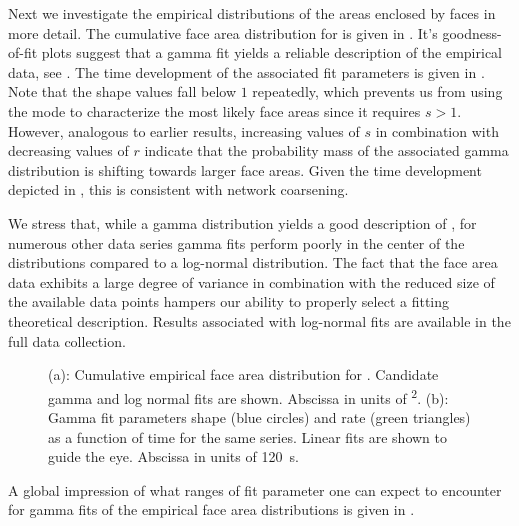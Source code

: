 		Next we investigate the empirical distributions of the areas enclosed by faces in more detail. The cumulative face area distribution for  is given in . It's goodness-of-fit plots suggest that a gamma fit yields a reliable description of the empirical data, see . The time development of the associated fit parameters is given in . Note that the shape values fall below $1$ repeatedly, which prevents us from using the mode to characterize the most likely face areas since it requires $s >1$. However, analogous to earlier results, increasing values of $s$ in combination with decreasing values of $r$ indicate that the probability mass of the associated gamma distribution is shifting towards larger face areas. Given the time development depicted in , this is consistent with network coarsening.

		We stress that, while a gamma distribution yields a good description of , for numerous other data series gamma fits perform poorly in the center of the distributions compared to a log-normal distribution. The fact that the face area data exhibits a large degree of variance in combination with the reduced size of the available data points hampers our ability to properly select a fitting theoretical description. Results associated with log-normal fits are available in the full data collection.

		\begin{figure}
			\centering
			\qquad

			\caption[Face area distribution]{(a): Cumulative empirical face area distribution for . Candidate gamma and log normal fits are shown. Abscissa in units of \si{\pixel\squared}. (b): Gamma fit parameters shape (blue circles) and rate (green triangles) as a function of time for the same series. Linear fits are shown to guide the eye. Abscissa in units of \SI{120}{\second}.}
			\label{fig:face_area_fit}
		\end{figure}


		A global impression of what ranges of fit parameter one can expect to encounter for gamma fits of the empirical face area distributions is given in . 


